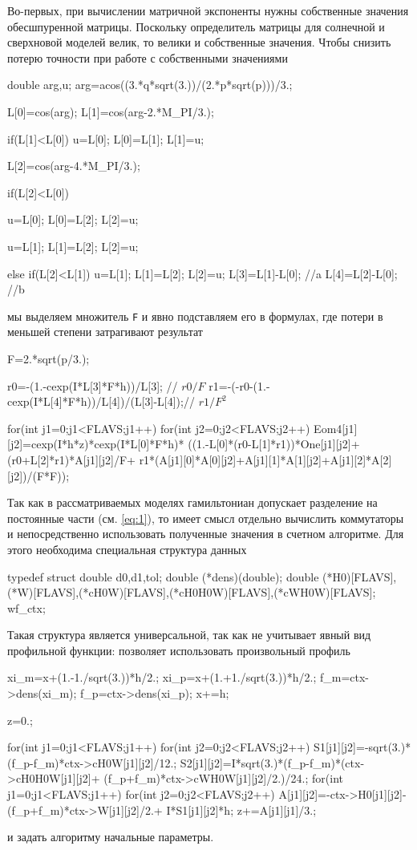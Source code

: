 \documentclass[12pt]{article}
\begin{document}
Во-первых, при вычислении матричной экспоненты нужны собственные значения
обесшпуренной матрицы. Поскольку определитель матрицы для солнечной и сверхновой
моделей велик, то велики и собственные значения. Чтобы снизить потерю точности
при работе с собственными значениями
\begin{Ccode}
  double arg,u;
  arg=acos((3.*q*sqrt(3.))/(2.*p*sqrt(p)))/3.;

  L[0]=cos(arg);
  L[1]=cos(arg-2.*M_PI/3.);

  if(L[1]<L[0])
  {
    u=L[0];
    L[0]=L[1];
    L[1]=u;
  }
  
  L[2]=cos(arg-4.*M_PI/3.);

  if(L[2]<L[0])
  {
    u=L[0];
    L[0]=L[2];
    L[2]=u;

    u=L[1];
    L[1]=L[2];
    L[2]=u;
  }
  else
    if(L[2]<L[1])
    {
      u=L[1];
      L[1]=L[2];
      L[2]=u;
    }
  L[3]=L[1]-L[0]; //a
  L[4]=L[2]-L[0]; //b
\end{Ccode}
мы выделяем множитель \verb|F| и явно подставляем его в формулах, где потери в
меньшей степени затрагивают результат
\begin{Ccode}
  F=2.*sqrt(p/3.);

  r0=-(1.-cexp(I*L[3]*F*h))/L[3]; // \(r0/F\)
  r1=-(-r0-(1.-cexp(I*L[4]*F*h))/L[4])/(L[3]-L[4]);// \(r1/F^2\)

  for(int j1=0;j1<FLAVS;j1++)
    for(int j2=0;j2<FLAVS;j2++)
    {
      Eom4[j1][j2]=cexp(I*h*z)*cexp(I*L[0]*F*h)*
      ((1.-L[0]*(r0-L[1]*r1))*One[j1][j2]+
      (r0+L[2]*r1)*A[j1][j2]/F+
      r1*(A[j1][0]*A[0][j2]+A[j1][1]*A[1][j2]+A[j1][2]*A[2][j2])/(F*F));
    }
\end{Ccode}

Так как в рассматриваемых моделях гамильтониан допускает разделение на постоянные части
(см. \eqref{eq:1}), то имеет смысл отдельно вычислить коммутаторы и непосредственно использовать полученные значения в счетном алгоритме. Для этого необходима специальная
структура данных
\begin{Ccode}
  typedef struct
  {
    double d0,d1,tol;
    double (*dens)(double);
    double (*H0)[FLAVS],(*W)[FLAVS],(*cH0W)[FLAVS],(*cH0H0W)[FLAVS],(*cWH0W)[FLAVS];  
  } wf_ctx;
\end{Ccode}
Такая структура является универсальной, так как не учитывает явный вид профильной функции: позволяет использовать произвольный профиль
\begin{Ccode}
  xi_m=x+(1.-1./sqrt(3.))*h/2.;
  xi_p=x+(1.+1./sqrt(3.))*h/2.;
  f_m=ctx->dens(xi_m);
  f_p=ctx->dens(xi_p);
  x+=h;
  
  z=0.;
    
  for(int j1=0;j1<FLAVS;j1++)
    for(int j2=0;j2<FLAVS;j2++)
    {
      S1[j1][j2]=-sqrt(3.)*(f_p-f_m)*ctx->cH0W[j1][j2]/12.;
      S2[j1][j2]=I*sqrt(3.)*(f_p-f_m)*(ctx->cH0H0W[j1][j2]+
                 (f_p+f_m)*ctx->cWH0W[j1][j2]/2.)/24.;
    }
  for(int j1=0;j1<FLAVS;j1++)
  {
    for(int j2=0;j2<FLAVS;j2++)
    {
      A[j1][j2]=-ctx->H0[j1][j2]-(f_p+f_m)*ctx->W[j1][j2]/2.+
      I*S1[j1][j2]*h;
    }
    z+=A[j1][j1]/3.;
  }
\end{Ccode}
и задать алгоритму начальные параметры.
\end{document}
